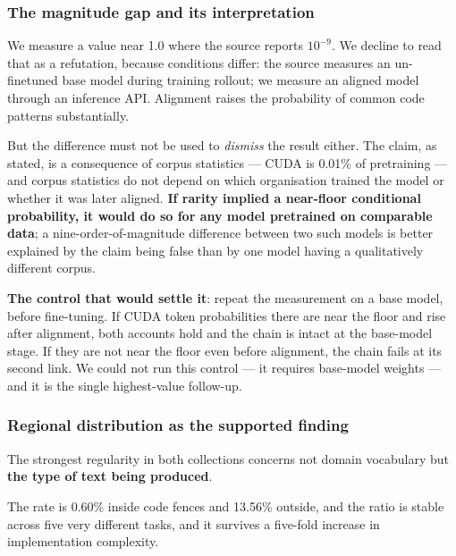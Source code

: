 \documentclass[
  11pt,
]{article}
\begin{document}
\hypertarget{the-magnitude-gap-and-its-interpretation}{%
\subsubsection{The magnitude gap and its
interpretation}\label{the-magnitude-gap-and-its-interpretation}}

We measure a value near 1.0 where the source reports \(10^{-9}\). We
decline to read that as a refutation, because conditions differ: the
source measures an un-finetuned base model during training rollout; we
measure an aligned model through an inference API. Alignment raises the
probability of common code patterns substantially.

But the difference must not be used to \emph{dismiss} the result either.
The claim, as stated, is a consequence of corpus statistics --- CUDA is
0.01\% of pretraining --- and corpus statistics do not depend on which
organisation trained the model or whether it was later aligned.
\textbf{If rarity implied a near-floor conditional probability, it would
do so for any model pretrained on comparable data}; a
nine-order-of-magnitude difference between two such models is better
explained by the claim being false than by one model having a
qualitatively different corpus.

\textbf{The control that would settle it}: repeat the measurement on a
base model, before fine-tuning. If CUDA token probabilities there are
near the floor and rise after alignment, both accounts hold and the
chain is intact at the base-model stage. If they are not near the floor
even before alignment, the chain fails at its second link. We could not
run this control --- it requires base-model weights --- and it is the
single highest-value follow-up.

\hypertarget{regional-distribution-as-the-supported-finding}{%
\subsubsection{Regional distribution as the supported
finding}\label{regional-distribution-as-the-supported-finding}}

The strongest regularity in both collections concerns not domain
vocabulary but \textbf{the type of text being produced}.

The rate is 0.60\% inside code fences and 13.56\% outside, and the ratio
is stable across five very different tasks, and it survives a five-fold
increase in implementation complexity.
\end{document}
